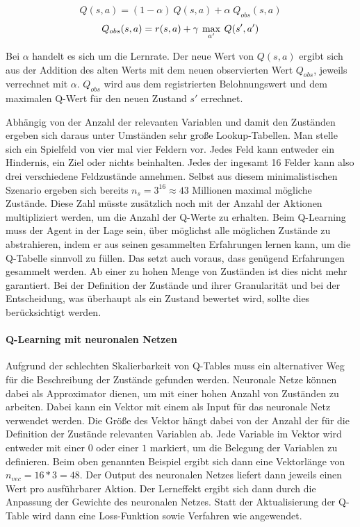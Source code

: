 $$ Q(s,a) = (1 - \alpha) \: Q(s,a) + \alpha \; Q_{obs} (s,a) $$
$$ Q_{obs} (s,a) = r(s,a) + \gamma \: \operatorname*{max}_{a'} \: Q(s',a')  $$

Bei $\alpha$ handelt es sich um die Lernrate. Der neue Wert von $Q(s,a)$ ergibt sich aus der Addition des alten Werts mit dem neuen observierten Wert $Q_{obs}$, jeweils verrechnet mit $\alpha$. $Q_{obs}$ wird aus dem registrierten Belohnungswert und dem maximalen Q-Wert für den neuen Zustand $s'$ errechnet.

Abhängig von der Anzahl der relevanten Variablen und damit den Zuständen ergeben sich daraus unter Umständen sehr große Lookup-Tabellen. Man stelle sich ein Spielfeld von vier mal vier Feldern vor. Jedes Feld kann entweder ein Hindernis, ein Ziel oder nichts beinhalten. Jedes der ingesamt 16 Felder kann also drei verschiedene Feldzustände annehmen. Selbst aus diesem minimalistischen Szenario ergeben sich bereits $n_s = 3^{16} \approx 43 $ Millionen maximal mögliche Zustände. Diese Zahl müsste zusätzlich noch mit der Anzahl der Aktionen multipliziert werden, um die Anzahl der Q-Werte zu erhalten. Beim Q-Learning muss der Agent in der Lage sein, über möglichst alle möglichen Zustände zu abstrahieren, indem er aus seinen gesammelten Erfahrungen lernen kann, um die Q-Tabelle sinnvoll zu füllen. Das setzt auch voraus, dass genügend Erfahrungen gesammelt werden. Ab einer zu hohen Menge von Zuständen ist dies nicht mehr garantiert. Bei der Definition der Zustände und ihrer Granularität und bei der Entscheidung, was überhaupt als ein Zustand bewertet wird, sollte dies berücksichtigt werden.


\paragraph{Q-Learning mit neuronalen Netzen}
Aufgrund der schlechten Skalierbarkeit von Q-Tables muss ein alternativer Weg für die Beschreibung der Zustände gefunden werden. Neuronale Netze können dabei als Approximator dienen, um mit einer hohen Anzahl von Zuständen zu arbeiten. Dabei kann ein Vektor mit einem  als Input für das neuronale Netz verwendet werden. Die Größe des Vektor hängt dabei von der Anzahl der für die Definition der Zustände relevanten Variablen ab. Jede Variable im Vektor wird entweder mit einer $0$ oder einer $1$ markiert, um die Belegung der Variablen zu definieren. Beim oben genannten Beispiel ergibt sich dann eine Vektorlänge von $n_{vec} = 16*3 = 48 $. Der Output des neuronalen Netzes liefert dann jeweils einen Wert pro ausführbarer Aktion. Der Lerneffekt ergibt sich dann durch die Anpassung der Gewichte des neuronalen Netzes. Statt der Aktualisierung der Q-Table wird dann eine Loss-Funktion sowie Verfahren wie  \cite{backpropagation} angewendet.




